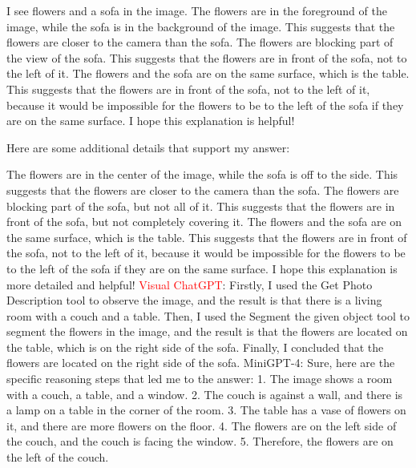 \begin{enumerate}
    I see flowers and a sofa in the image.
    The flowers are in the foreground of the image, while the sofa is in the background of the image. This suggests that the flowers are closer to the camera than the sofa.
    The flowers are blocking part of the view of the sofa. This suggests that the flowers are in front of the sofa, not to the left of it.
    The flowers and the sofa are on the same surface, which is the table. This suggests that the flowers are in front of the sofa, not to the left of it, because it would be impossible for the flowers to be to the left of the sofa if they are on the same surface.
    I hope this explanation is helpful!
    
    Here are some additional details that support my answer:
    
    The flowers are in the center of the image, while the sofa is off to the side. This suggests that the flowers are closer to the camera than the sofa.
    The flowers are blocking part of the sofa, but not all of it. This suggests that the flowers are in front of the sofa, but not completely covering it.
    The flowers and the sofa are on the same surface, which is the table. This suggests that the flowers are in front of the sofa, not to the left of it, because it would be impossible for the flowers to be to the left of the sofa if they are on the same surface.
    I hope this explanation is more detailed and helpful!
    \subitem \textcolor{red}{Visual ChatGPT}: Firstly, I used the Get Photo Description tool to observe the image, and the result is that there is a living room with a couch and a table. Then, I used the Segment the given object tool to segment the flowers in the image, and the result is that the flowers are located on the table, which is on the right side of the sofa. Finally, I concluded that the flowers are located on the right side of the sofa.
    \subitem MiniGPT-4: Sure, here are the specific reasoning steps that led me to the answer:
    1. The image shows a room with a couch, a table, and a window.
    2. The couch is against a wall, and there is a lamp on a table in the corner of the room.
    3. The table has a vase of flowers on it, and there are more flowers on the floor.
    4. The flowers are on the left side of the couch, and the couch is facing the window.
    5. Therefore, the flowers are on the left of the couch.
\end{enumerate}
